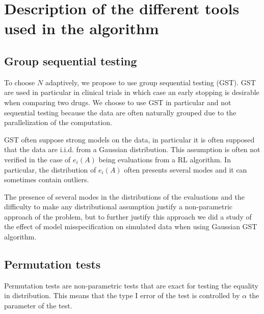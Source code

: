 \documentclass{article}
\theoremstyle{plain}
\theoremstyle{remark}
\newcommand{\1}{\mathbbm{1}}
\newcommand{\todoT}[1]{\todo[inline,color=blue!40]{{\textbf{T:}~}#1}}
\numberwithin{equation}{section}
\begin{document}



\section{Description of the different tools used in the algorithm}
\subsection{Group sequential testing}

To choose $N$ adaptively, we propose to use group sequential testing (GST). GST are used in particular in clinical trials in which case an early stopping is desirable when comparing two drugs. We choose to use GST in particular and not sequential testing because the data are often naturally grouped due to the parallelization of the computation.

GST often suppose strong models on the data, in particular it is often supposed that the data are i.i.d. from a Gaussian distribution. This assumption is often not verified in the case of $e_i(A)$ being evaluations from a RL algorithm. In particular, the distribution of $e_i(A)$ often presents several modes and it can sometimes contain outliers.

The presence of several modes in the distributions of the evaluations and the difficulty to make any distributional assumption justify a non-parametric approach of the problem, but to further justify this approach we did a study of the effect of model misspecification on simulated data when using Gaussian GST algorithm.


\todoT{Explain early accept also} 

\subsection{Permutation tests}
Permutation tests are non-parametric tests that are exact for testing the equality in distribution. This means that the type I error of the test is controlled by $\alpha$ the parameter of the test.
\end{document}
